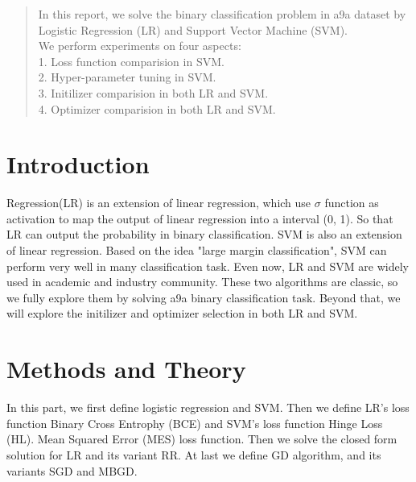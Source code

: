 \documentclass[journal, a4paper]{IEEEtran}
\begin{document}
\begin{abstract}
In this report, we solve the binary classification problem in a9a dataset by Logistic Regression (LR) and Support Vector Machine (SVM). \\
We perform experiments on four aspects: \\
1. Loss function comparision in SVM. \\
2. Hyper-parameter tuning in SVM. \\
3. Initilizer comparision in both LR and SVM. \\
4. Optimizer comparision in both LR and SVM. \\
\end{abstract}

\section{Introduction}
 Regression(LR) is an extension of linear regression, which use $\sigma$ function as activation to map the output of linear regression into a interval (0, 1). So that LR can output the probability in binary classification. SVM is also an extension of linear regression. Based on the idea "large margin classification", SVM can perform very well in many classification task. Even now, LR and SVM are widely used in academic and industry community. These two algorithms are classic, so we fully explore them by solving a9a binary classification task. Beyond that, we will explore the initilizer and optimizer selection in both LR and SVM. 

\section{Methods and Theory}
In this part, we first define logistic regression and SVM. Then we define LR's loss function Binary Cross Entrophy (BCE) and SVM's loss function Hinge Loss (HL). Mean Squared Error (MES) loss function. Then we solve the closed form solution for LR and its variant RR. At last we define GD algorithm, and its variants SGD and MBGD.
\end{document}
